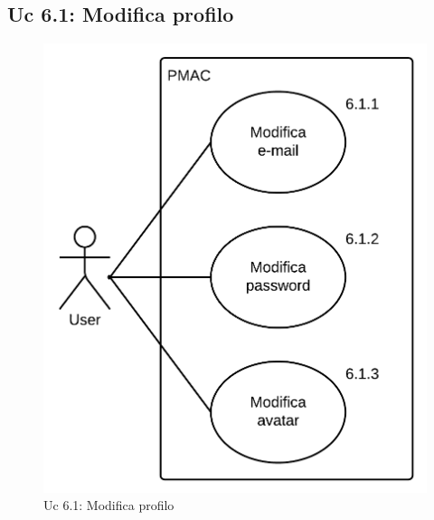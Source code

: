 \documentclass[10pt,a4paper]{article}
\begin{document}
\newpage

\subsection{Uc 6.1: Modifica profilo}
\begin{figure}[ht]
\centering
\caption{Uc 6.1: Modifica profilo}
\includegraphics[scale=0.9]{UseCase/Uc6_1} %
\end{figure}
\end{document}
